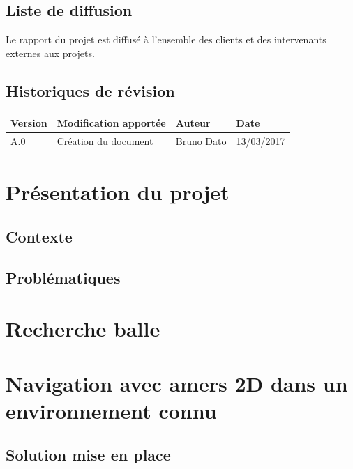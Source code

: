 \documentclass[10pt,a4paper]{article}
\begin{document}
\subsection*{Liste de diffusion}

Le rapport du projet est diffusé à l'ensemble des clients et des intervenants externes aux projets.

\subsection*{Historiques de révision}

\begin{center}
    \begin{tabular}{| l | l | l | l |}
    \hline
     \rowcolor{gray} Version & Modification apportée & Auteur & Date \\ \hline
    A.0 & Création du document & Bruno Dato & 13/03/2017\\ \hline
     
    \end{tabular}
\end{center}

\newpage
\tableofcontents
\newpage
	

\section{Présentation du projet}
\label{sec:presentation}

\subsection{Contexte}

\subsection{Problématiques}

\newpage
\section{Recherche balle}
\label{sec:recherche_balle}

\newpage
\section{Navigation avec amers 2D dans un environnement connu}
\label{sec:navigation_avec_amers_2D_dans_un_environnement_connu}

\subsection{Solution mise en place}
\label{sec:solution_mise_en_place}
\end{document}

